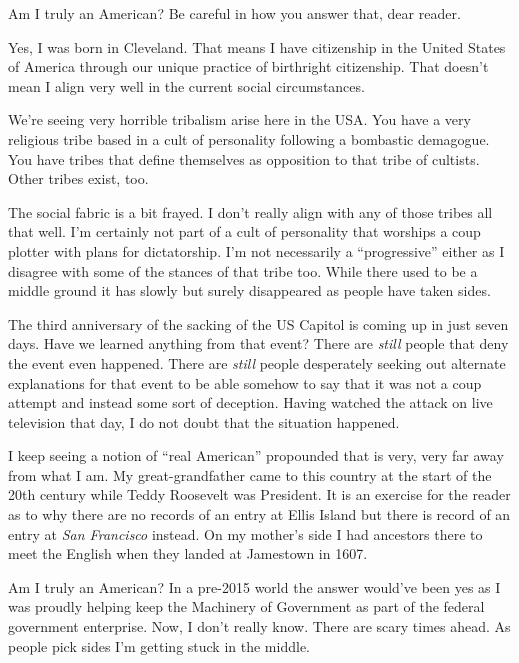 Am I truly an American? Be careful in how you answer that, dear reader.

Yes, I was born in Cleveland. That means I have citizenship in the
United States of America through our unique practice of birthright
citizenship. That doesn't mean I align very well in the current social
circumstances.

We're seeing very horrible tribalism arise here in the USA. You have a
very religious tribe based in a cult of personality following a
bombastic demagogue. You have tribes that define themselves as
opposition to that tribe of cultists. Other tribes exist, too.

The social fabric is a bit frayed. I don't really align with any of
those tribes all that well. I'm certainly not part of a cult of
personality that worships a coup plotter with plans for dictatorship.
I'm not necessarily a ``progressive'' either as I disagree with some of
the stances of that tribe too. While there used to be a middle ground it
has slowly but surely disappeared as people have taken sides.

The third anniversary of the sacking of the US Capitol is coming up in
just seven days. Have we learned anything from that event? There are
\emph{still} people that deny the event even happened. There are
\emph{still} people desperately seeking out alternate explanations for
that event to be able somehow to say that it was not a coup attempt and
instead some sort of deception. Having watched the attack on live
television that day, I do not doubt that the situation happened.

I keep seeing a notion of ``real American'' propounded that is very,
very far away from what I am. My great-grandfather came to this country
at the start of the 20th century while Teddy Roosevelt was President. It
is an exercise for the reader as to why there are no records of an entry
at Ellis Island but there is record of an entry at \emph{San Francisco}
instead. On my mother's side I had ancestors there to meet the English
when they landed at Jamestown in 1607.

Am I truly an American? In a pre-2015 world the answer would've been yes
as I was proudly helping keep the Machinery of Government as part of the
federal government enterprise. Now, I don't really know. There are scary
times ahead. As people pick sides I'm getting stuck in the middle.
